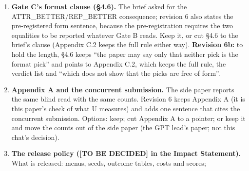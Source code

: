 \documentclass{article}
\theoremstyle{plain}
\theoremstyle{definition}
\theoremstyle{remark}
\begin{document}
\begin{enumerate}
        with option C as the fallback stands, and Olmo-3-7B-Instruct is a third
        7--8B model, [PLANNED; funding-gated; first 7--8B model cut] (\S{}4.1,
        \S{}6; decision 48). Both reviews bear on it. Review A (``What Appendix
        B's numbers add'', item 2): with a 6-seed MDE of about 11--12~pp at
        7--8B, the $\pm$5~pp TOST becomes nearly unreachable (the chance of
        \emph{equivalent} at a true difference of 0 is about 0.29 for 6 against
        8 seeds at 1.7 times the 1B seed SD, review A's calculation), so
        $\delta$, the seeds or pairing must change before option B is final
        (decision 39). Review B (\S{}8.1, W1): the same arithmetic; either a
        wider SESOI at 7--8B stated in the abstract, or about four times the
        seeds on fewer contrasts (P1, P4 and the best reference).
        \textbf{Revision 6c:} FC-1 is closed (the user confirmed the
        ambitious-default rule in the lead's chat; FOCUS fcf79a2), so the rule
        no longer rests on a relay. FOCUS does not name option B or C; the
        option is still recorded only as relayed. UW-21 keeps OLMo-2-1B's P1--P6
        as the confirmatory primary family under any re-plan option, which
        matches the body's stage-1 framing (conflict 52).
  \item \textbf{Gate C's format clause (\S{}4.6).} The brief asked for the
        ATTR\_BETTER/REP\_BETTER consequence; revision 6 also states the
        pre-registered form sentence, because the pre-registration requires the
        two equalities to be reported whatever Gate B reads. Keep it, or cut
        \S{}4.6 to the brief's clause (Appendix C.2 keeps the full rule either
        way). \textbf{Revision 6b:} to hold the length, \S{}4.6 keeps ``the
        paper may say only that neither pick is the format pick'' and points to
        Appendix C.2, which keeps the full rule, the verdict list and ``which
        does not show that the picks are free of form''.
  \item \textbf{Appendix A and the concurrent submission.} The side paper
        reports the same blind read with the same counts. Revision 6 keeps
        Appendix A (it is this paper's check of what U measures) and adds one
        sentence that cites the concurrent submission. Options: keep; cut
        Appendix A to a pointer; or keep it and move the counts out of the side
        paper (the GPT lead's paper; not this chat's decision).
  \item \textbf{The release policy ([TO BE DECIDED] in the Impact Statement).}
        What is released: menus, seeds, outcome tables, costs and scores;

\end{enumerate}
\end{document}
